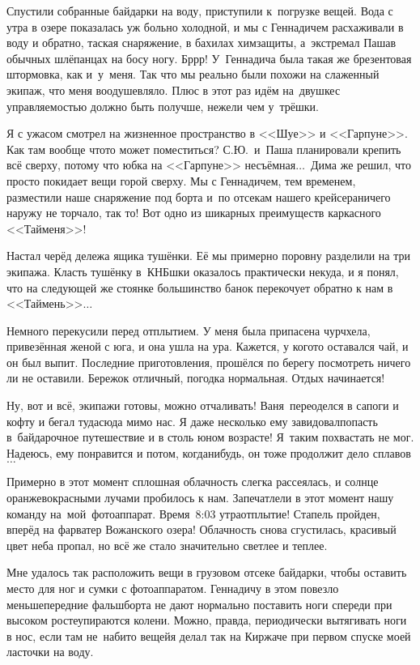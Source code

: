 Спустили собранные байдарки на воду, приступили к~погрузке вещей. Вода с утра в озере показалась уж больно холодной, и мы с Геннадичем расхаживали в воду и обратно, таская снаряжение, в бахилах химзащиты, а~экстремал Паша\mdash в обычных шлёпанцах на босу ногу. Бр\sdash р\sdash р! У~Геннадича была такая же брезентовая штормовка, как и~у~меня. Так что мы реально были похожи на слаженный экипаж, что меня воодушевляло. Плюс в этот раз идём на~двушке\mdash с управляемостью должно быть получше, нежели чем у~трёшки.

Я с ужасом смотрел на жизненное пространство в <<Шуе>> и <<Гарпуне>>. Как там вообще что\sdash то может поместиться? С.Ю.~и~Паша планировали крепить всё сверху, потому что юбка на <<Гарпуне>> несъёмная$\ldots$~Дима же решил, что просто покидает вещи горой сверху. Мы с Геннадичем, тем временем, разместили наше снаряжение под борта и~по отсекам нашего крейсера\mdash ничего наружу не торчало, так то! Вот одно из шикарных преимуществ каркасного <<Тайменя>>!

Настал черёд дележа ящика тушёнки. Её мы примерно поровну разделили на три экипажа. Класть тушёнку в~КНБ\sdash шки оказалось практически некуда, и я понял, что на следующей же стоянке большинство банок перекочует обратно к нам в <<Таймень>>$\ldots$

Немного перекусили перед отплытием. У меня была припасена чурчхела, привезённая женой с юга, и она ушла на ура. Кажется, у кого\sdash то оставался чай, и он был выпит. Последние приготовления, прошёлся по берегу посмотреть ничего ли не оставили. Бережок отличный, погодка нормальная. Отдых начинается!

Ну, вот и всё, экипажи готовы, можно отчаливать! Ваня~переоделся в сапоги и кофту и бегал туда\sdash сюда мимо нас. Я даже несколько ему завидовал\mdash попасть в~байдарочное путешествие и в столь юном возрасте! Я~таким похвастать не мог. Надеюсь, ему понравится и потом, когда\sdash нибудь, он тоже продолжит дело сплавов$\ldots$

Примерно в этот момент сплошная облачность слегка рассеялась, и солнце оранжево\sdash красными лучами пробилось к нам. Запечатлели в этот момент нашу команду на~мой~фотоаппарат. Время~8:03 утра\mdash отплытие! Стапель пройден, вперёд на фарватер Вожанского  озера! Облачность снова сгустилась, красивый цвет неба пропал, но всё же стало значительно светлее и теплее.

Мне удалось так расположить вещи в грузовом отсеке байдарки, чтобы оставить место для ног и сумки с фотоаппаратом. Геннадичу в этом повезло меньше\mdash передние фальшборта не дают нормально поставить ноги спереди при высоком росте\mdash упираются колени. Можно, правда, периодически вытягивать ноги в нос, если там не~набито вещей\mdash я делал так на Киржаче при первом спуске моей ласточки на воду.  

